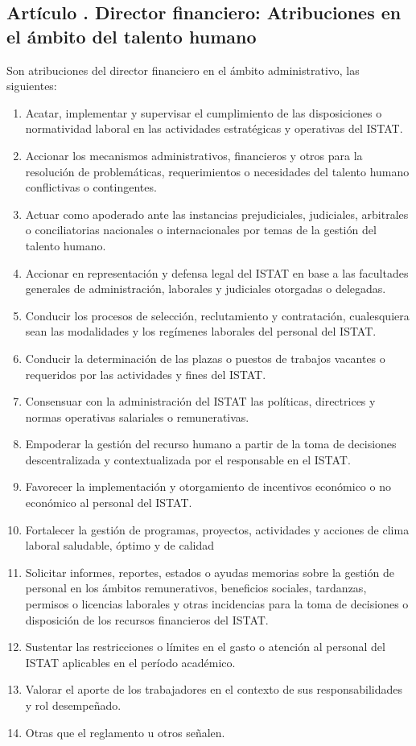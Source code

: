 \subsection{Artículo . Director financiero: Atribuciones en el ámbito del talento humano}
\addtocounter{ns}{1}
Son atribuciones del director financiero en el ámbito administrativo, las siguientes: 
\begin{enumerate}
\item Acatar, implementar y supervisar el cumplimiento de las disposiciones o normatividad laboral en las actividades estratégicas y operativas del ISTAT. 
\item Accionar los mecanismos administrativos, financieros y otros para la resolución de problemáticas, requerimientos o necesidades del talento humano conflictivas o contingentes. 
\item Actuar como apoderado ante las instancias prejudiciales, judiciales, arbitrales o conciliatorias nacionales o internacionales por temas de la gestión del talento humano. 
\item Accionar en representación y defensa legal del ISTAT en base a las facultades generales de administración, laborales y judiciales otorgadas o delegadas. 
\item Conducir los procesos de selección, reclutamiento y contratación, cualesquiera sean las modalidades y los regímenes laborales del personal del ISTAT. 
\item Conducir la determinación de las plazas o puestos de trabajos vacantes o requeridos por las actividades y fines del ISTAT. 
\item Consensuar con la administración del ISTAT las políticas, directrices y normas operativas salariales o remunerativas. 
\item Empoderar la gestión del recurso humano a partir de la toma de decisiones descentralizada y contextualizada por el responsable en el ISTAT. 
\item Favorecer la implementación y otorgamiento de incentivos económico o no económico al personal del ISTAT. 
\item Fortalecer la gestión de programas, proyectos, actividades y acciones de clima laboral saludable, óptimo y de calidad 
\item Solicitar informes, reportes, estados o ayudas memorias sobre la gestión de personal en los ámbitos remunerativos, beneficios sociales, tardanzas, permisos o licencias laborales y otras incidencias para la toma de decisiones o disposición de los recursos financieros del ISTAT. 
\item Sustentar las restricciones o límites en el gasto o atención al personal del ISTAT aplicables en el período académico. 
\item Valorar el aporte de los trabajadores en el contexto de sus responsabilidades y rol desempeñado. 
\item Otras que el reglamento u otros señalen.  
\end{enumerate}
